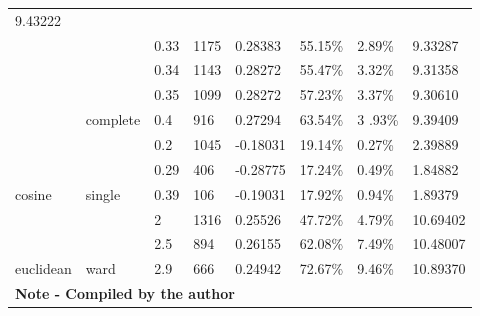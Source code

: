 {\begin{longtable}[c]{|llllllll|}
  9.43222 \\ \cline{3-8} 
\multicolumn{1}{|l|}{} &
  \multicolumn{1}{l|}{} &
  \multicolumn{1}{l|}{0.33} &
  \multicolumn{1}{l|}{1175} &
  \multicolumn{1}{l|}{0.28383} &
  \multicolumn{1}{l|}{55.15\%} &
  \multicolumn{1}{l|}{2.89\%} &
  9.33287 \\ \cline{3-8} 
\multicolumn{1}{|l|}{} &
  \multicolumn{1}{l|}{} &
  \multicolumn{1}{l|}{0.34} &
  \multicolumn{1}{l|}{1143} &
  \multicolumn{1}{l|}{0.28272} &
  \multicolumn{1}{l|}{55.47\%} &
  \multicolumn{1}{l|}{3.32\%} &
  9.31358 \\ \cline{3-8} 
\multicolumn{1}{|l|}{} &
  \multicolumn{1}{l|}{} &
  \multicolumn{1}{l|}{0.35} &
  \multicolumn{1}{l|}{1099} &
  \multicolumn{1}{l|}{0.28272} &
  \multicolumn{1}{l|}{57.23\%} &
  \multicolumn{1}{l|}{3.37\%} &
  9.30610 \\ \cline{3-8} 
\multicolumn{1}{|l|}{} &
  \multicolumn{1}{l|}{\multirow{-8}{*}{complete}} &
  \multicolumn{1}{l|}{0.4} &
  \multicolumn{1}{l|}{916} &
  \multicolumn{1}{l|}{0.27294} &
  \multicolumn{1}{l|}{63.54\%} &
  \multicolumn{1}{l|}{3 .93\%} &
  9.39409 \\ \cline{2-8} 
\multicolumn{1}{|l|}{} &
  \multicolumn{1}{l|}{} &
  \multicolumn{1}{l|}{0.2} &
  \multicolumn{1}{l|}{1045} &
  \multicolumn{1}{l|}{-0.18031} &
  \multicolumn{1}{l|}{19.14\%} &
  \multicolumn{1}{l|}{0.27\%} &
  2.39889 \\ \cline{3-8} 
\multicolumn{1}{|l|}{} &
  \multicolumn{1}{l|}{} &
  \multicolumn{1}{l|}{0.29} &
  \multicolumn{1}{l|}{406} &
  \multicolumn{1}{l|}{-0.28775} &
  \multicolumn{1}{l|}{{\color[HTML]{212121} 17.24\%}} &
  \multicolumn{1}{l|}{0.49\%} &
  1.84882 \\ \cline{3-8} 
\multicolumn{1}{|l|}{\multirow{-23}{*}{cosine}} &
  \multicolumn{1}{l|}{\multirow{-3}{*}{single}} &
  \multicolumn{1}{l|}{0.39} &
  \multicolumn{1}{l|}{106} &
  \multicolumn{1}{l|}{-0.19031} &
  \multicolumn{1}{l|}{17.92\%} &
  \multicolumn{1}{l|}{0.94\%} &
  1.89379 \\ \hline
\multicolumn{1}{|l|}{} &
  \multicolumn{1}{l|}{} &
  \multicolumn{1}{l|}{2} &
  \multicolumn{1}{l|}{1316} &
  \multicolumn{1}{l|}{0.25526} &
  \multicolumn{1}{l|}{47.72\%} &
  \multicolumn{1}{l|}{4.79\%} &
  10.69402 \\ \cline{3-8} 
\multicolumn{1}{|l|}{} &
  \multicolumn{1}{l|}{} &
  \multicolumn{1}{l|}{2.5} &
  \multicolumn{1}{l|}{894} &
  \multicolumn{1}{l|}{0.26155} &
  \multicolumn{1}{l|}{62.08\%} &
  \multicolumn{1}{l|}{7.49\%} &
  10.48007 \\ \cline{3-8} 
\multicolumn{1}{|l|}{\multirow{-3}{*}{euclidean}} &
  \multicolumn{1}{l|}{\multirow{-3}{*}{ward}} &
  \multicolumn{1}{l|}{2.9} &
  \multicolumn{1}{l|}{666} &
  \multicolumn{1}{l|}{0.24942} &
  \multicolumn{1}{l|}{{\color[HTML]{212121} 72.67\%}} &
  \multicolumn{1}{l|}{9.46\%} &
  10.89370 \\ \hline
\multicolumn{8}{|l|}{\textbf{Note - Compiled by the author}} \\ \hline
\end{longtable}}

